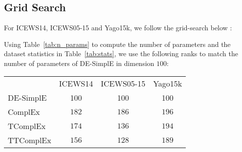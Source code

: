 \documentclass{article}
\begin{document}
\subsection{Grid Search}
\label{app:grid_search}
For ICEWS14, ICEWS05-15 and Yago15k, we follow the grid-search below :

Using Table~\ref{tab:n_params} to compute the number of parameters and the dataset statistics in Table~\ref{tab:stats}, we use the following ranks to match the number of parameters of DE-SimplE in dimension $100$:
\begin{table}[h]
    \centering
    \begin{tabular}{lccc}
        \toprule
         {} & ICEWS14 & ICEWS05-15 & Yago15k \\
         DE-SimplE & 100 & 100 & 100\\
         \midrule
         ComplEx &$182$&$186$&$196$ \\
         TComplEx &$174$&$136$&$194$  \\
         TTComplEx & $156$&$128$&$189$\\
         \bottomrule
    \end{tabular}
    \label{tab:ranks}
\end{table} 
\end{document}

